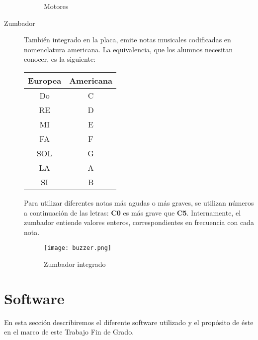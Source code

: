 \begin{description}
		\begin{figure}[H]
			\begin{center}
				\begin{subfigure}
					[Puerto de conexión de los motores]{
						\texttt{[image: puertomotor.png]}
						\label{img:puertomotor}}
				\end{subfigure}
				\begin{subfigure}
					[Motor DC]{			
						\texttt{[image: motorDC2.png]}
						\label{img:motor1}}
				\end{subfigure}
				\begin{subfigure}
					[Motor DC: montaje con rueda]{			
						\texttt{[image: motorDC.png]}
						\label{img:motor2}}
				\end{subfigure}
				\label{img:motores}
				\caption{Motores}
			\end{center}
		\end{figure}
	
	\item [Zumbador] También integrado en la placa, emite notas musicales codificadas en nomenclatura americana. La equivalencia, que los alumnos necesitan conocer, es la siguiente:
	\begin{center}
		\begin{tabular}{ c | c }	
			Europea & Americana \\
			\hline			
			Do & C \\
			RE & D \\
			MI & E \\
			FA & F \\
			SOL & G\\
			LA & A \\
			SI & B \\
		\end{tabular}
	\end{center}
	Para utilizar diferentes notas más agudas o más graves, se utilizan números a continuación de las letras: \textbf{C0} es más grave que \textbf{C5}. Internamente, el zumbador entiende valores enteros, correspondientes en frecuencia con cada nota.
	
	\begin{figure}[H]
		\texttt{[image: buzzer.png]}
		\centering
		\label{img:zumbador}
		\caption{Zumbador integrado}
	\end{figure}
\end{description}
\section{Software}\label{sec:software}
En esta sección describiremos el diferente software utilizado y el propósito de éste en el marco de este Trabajo Fin de Grado. 

